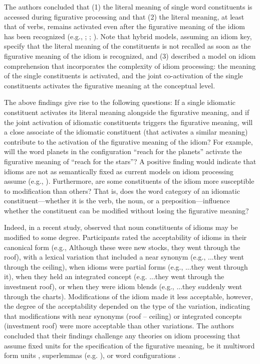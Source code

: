\documentclass[output=paper]{langsci/langscibook}
\begin{document}
The authors concluded that (1) the literal meaning of single word constituents is accessed during figurative processing and that (2) the literal meaning, at least that of verbs, remains activated even after the figurative meaning of the idiom has been recognized (e.g., \citet{cacciari:1988}; \citet{cutting:1997}; \citet{sprenger:2006}). Note that hybrid models, assuming an idiom key, specify that the literal meaning of the constituents is not recalled as soon as the figurative meaning of the idiom is recognized, and (3) described a model on idiom comprehension that incorporates the complexity of idiom processing: the meaning of the single constituents is activated, and the joint co-activation of the single constituents activates the figurative meaning at the conceptual level.

The above findings give rise to the following questions: If a single idiomatic constituent activates its literal meaning alongside the figurative meaning, and if the joint activation of idiomatic constituents triggers the figurative meaning, will a close associate of the idiomatic constituent (that activates a similar meaning) contribute to the activation of the figurative meaning of the idiom? For example, will the word planets in the configuration “reach for the planets” activate the figurative meaning of “reach for the stars”? A positive finding would indicate that idioms are not as semantically fixed as current models on idiom processing assume (e.g., \citet{sprenger:2006}). Furthermore, are some constituents of the idiom more susceptible to modification than others? That is, does the word category of an idiomatic constituent—whether it is the verb, the noun, or a preposition—influence whether the constituent can be modified without losing the figurative meaning? 

Indeed, in a recent study, \citet{geeraert:2017} observed that noun constituents of idioms may be modified to some degree.  Participants rated the acceptability of idioms in their canonical form (e.g., Although these were new stocks, they went through the roof), with a lexical variation that included a near synonym (e.g., ...they went through the ceiling), when idioms were partial forms (e.g., ...they went through it), when they held an integrated concept (e.g. ...they went through the investment roof), or when they were idiom blends (e.g., ...they suddenly went through the charts). Modifications of the idiom made it less acceptable, however, the degree of the acceptability depended on the type of the variation, indicating that modifications with near synonyms (roof – ceiling) or integrated concepts (investment roof) were more acceptable than other variations. The authors concluded that their findings challenge any theories on idiom processing that assume fixed units for the specification of the figurative meaning, be it multiword form units \citep{bobrow:1973}, superlemmas (e.g. \citet{sprenger:2006}), or word configurations \citep{cacciari:1988}. 
\end{document}
